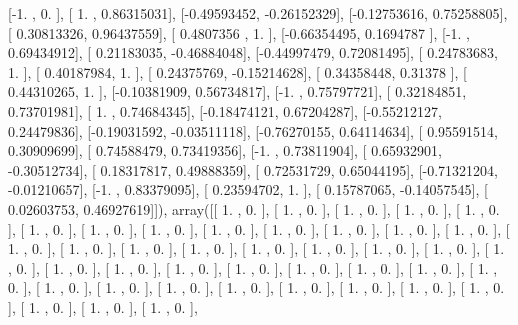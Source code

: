 \documentclass{article}
\begin{document}
       [-1.        ,  0.        ],
       [ 1.        ,  0.86315031],
       [-0.49593452, -0.26152329],
       [-0.12753616,  0.75258805],
       [ 0.30813326,  0.96437559],
       [ 0.4807356 ,  1.        ],
       [-0.66354495,  0.1694787 ],
       [-1.        ,  0.69434912],
       [ 0.21183035, -0.46884048],
       [-0.44997479,  0.72081495],
       [ 0.24783683,  1.        ],
       [ 0.40187984,  1.        ],
       [ 0.24375769, -0.15214628],
       [ 0.34358448,  0.31378   ],
       [ 0.44310265,  1.        ],
       [-0.10381909,  0.56734817],
       [-1.        ,  0.75797721],
       [ 0.32184851,  0.73701981],
       [ 1.        ,  0.74684345],
       [-0.18474121,  0.67204287],
       [-0.55212127,  0.24479836],
       [-0.19031592, -0.03511118],
       [-0.76270155,  0.64114634],
       [ 0.95591514,  0.30909699],
       [ 0.74588479,  0.73419356],
       [-1.        ,  0.73811904],
       [ 0.65932901, -0.30512734],
       [ 0.18317817,  0.49888359],
       [ 0.72531729,  0.65044195],
       [-0.71321204, -0.01210657],
       [-1.        ,  0.83379095],
       [ 0.23594702,  1.        ],
       [ 0.15787065, -0.14057545],
       [ 0.02603753,  0.46927619]]), array([[ 1.        ,  0.        ],
       [ 1.        ,  0.        ],
       [ 1.        ,  0.        ],
       [ 1.        ,  0.        ],
       [ 1.        ,  0.        ],
       [ 1.        ,  0.        ],
       [ 1.        ,  0.        ],
       [ 1.        ,  0.        ],
       [ 1.        ,  0.        ],
       [ 1.        ,  0.        ],
       [ 1.        ,  0.        ],
       [ 1.        ,  0.        ],
       [ 1.        ,  0.        ],
       [ 1.        ,  0.        ],
       [ 1.        ,  0.        ],
       [ 1.        ,  0.        ],
       [ 1.        ,  0.        ],
       [ 1.        ,  0.        ],
       [ 1.        ,  0.        ],
       [ 1.        ,  0.        ],
       [ 1.        ,  0.        ],
       [ 1.        ,  0.        ],
       [ 1.        ,  0.        ],
       [ 1.        ,  0.        ],
       [ 1.        ,  0.        ],
       [ 1.        ,  0.        ],
       [ 1.        ,  0.        ],
       [ 1.        ,  0.        ],
       [ 1.        ,  0.        ],
       [ 1.        ,  0.        ],
       [ 1.        ,  0.        ],
       [ 1.        ,  0.        ],
       [ 1.        ,  0.        ],
       [ 1.        ,  0.        ],
       [ 1.        ,  0.        ],
       [ 1.        ,  0.        ],
       [ 1.        ,  0.        ],
       [ 1.        ,  0.        ],
       [ 1.        ,  0.        ],
       [ 1.        ,  0.        ],
       [ 1.        ,  0.        ],
\end{document}
